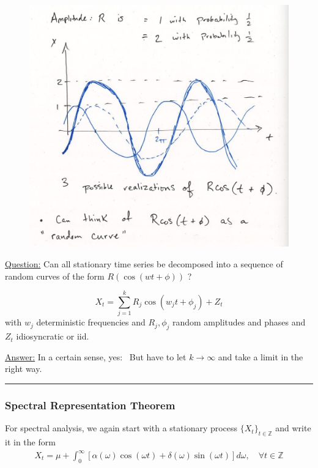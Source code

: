 \begin{figure}[H]
\includegraphics[scale=0.25]{images/Screenshot 2024-04-29 at 08.38.59.jpg}
\centering
\end{figure}

\underline{Question:} Can all stationary time series be decomposed into a sequence of random curves of the form $R(\cos(wt + \phi))$ ? 

\[X_t = \sum_{j=1}^k R_j \cos(w_j t +\phi_j)+Z_t \]
with $w_j$ deterministic frequencies and $R_j, \phi_j$ random amplitudes and phases and $Z_t$ idiosyncratic or iid. 

\underline{Answer:} In a certain sense, yes: \
But have to let $k\rightarrow \infty$ and take a limit in the right way. \\

\noindent
\rule{\linewidth}{0.4pt}
\bigskip

\subsubsection{Spectral Representation Theorem}
For spectral analysis, we again start with a stationary process $\{X_t\}_{t\in \mathbb{Z}}$ and write it in the form 
\begin{align}
    X_t=\mu+\int_0^\infty \left[\alpha(\omega) \cos(\omega t) + \delta(\omega) \sin(\omega t) \right] d\omega, \quad \forall t \in \mathbb{Z} \label{SP1}
\end{align}


